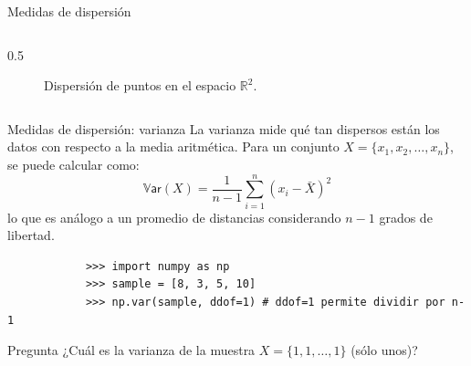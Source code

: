 \documentclass[aspectratio=169,handout]{beamer}
\begin{document}
\begin{frame}{Medidas de dispersión}
\begin{columns}
\begin{column}{0.5\linewidth}
\begin{figure}[H]
                    \caption{Dispersión de puntos en el espacio $\mathbb{R}^2$.}
                    \label{fig:scatter-variability}
                \end{figure}
            \end{column}
        \end{columns}
    \end{frame}

    \begin{frame}[fragile]{Medidas de dispersión: varianza}
        La varianza mide qué tan dispersos están los datos con respecto a la media aritmética. Para un conjunto $X = \{x_1, x_2, \dots, x_n\}$, se puede calcular como:
        \[ 
            \mathbb{V}\textsf{ar}(X) = \frac{1}{n-1} \sum^n_{i=1} \left(x_i - \bar{X}\right)^2 
        \]
        lo que es análogo a un promedio de distancias considerando $n-1$ grados de libertad.
        \pause
        \begin{verbatim}
            >>> import numpy as np
            >>> sample = [8, 3, 5, 10]
            >>> np.var(sample, ddof=1) # ddof=1 permite dividir por n-1
        \end{verbatim}
        \pause
        \begin{block}{Pregunta}
            ¿Cuál es la varianza de la muestra $X = \{1, 1, \dots, 1\}$ (sólo unos)?
        \end{block}
    \end{frame}
\end{document}
